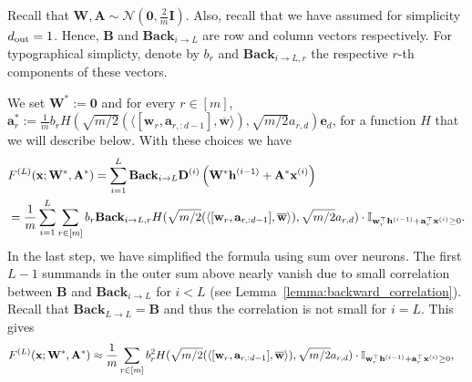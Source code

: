 Recall that $\mathbf{W}, \mathbf{A} \sim \mathcal{N}(\mathbf{0}, \frac{2}{m}\mathbf{I})$. Also, recall that we have assumed for simplicity $d_{\mathrm{out}}  = 1$. Hence, $\mathbf{B}$ and $\mathbf{Back}_{i \to L}$ are row and column vectors respectively. For typographical simplicty, denote by $b_r$ and $\mathbf{Back}_{i \to L, r}$ the respective $r$-th components of these vectors.



We set $\mathbf{W}^{\ast} := \mathbf{0}$ and for every $r \in [m]$, $\mathbf{a}_r^{\ast} :=\frac{1}{m} b_r H( \sqrt{m/2} (\langle [\mathbf{w}_{r}, \mathbf{a}_{r, :d-1}],  \overline{\mathbf{w}} \rangle), \sqrt{m/2} a_{r, d}) \mathbf{e}_d$, for a function $H$ that we will describe below. With these choices we have
    \begin{align*}
        &F^{(L)}(\bx; \mathbf{W}^{\ast}, \mathbf{A}^{\ast})  = \sum_{i=1}^{L}  \mathbf{Back}_{i \rightarrow L} \mathbf{D}^{(i)} \left(\mathbf{W}^{\ast} \mathbf{h}^{(i-1)} + \mathbf{A}^{\ast} \mathbf{x}^{(i)}\right) 
        \\&= \frac{1}{m} \sum_{i=1}^{L}   \sum_{r \in [m]}  b_{r}  \mathbf{Back}_{i \to L, r}  H( \sqrt{m/2} (\langle [\mathbf{w}_r, \mathbf{a}_{r, :d-1}],  \overline{\mathbf{w}} \rangle), \sqrt{m/2} a_{r, d})    \cdot \mathbb{I}_{\mathbf{w}_r^{\top} \mathbf{h}^{(i-1)} + \mathbf{a}_r^{\top} \mathbf{x}^{(i)} \ge 0}. %
	\end{align*}
	In the last step, we have simplified the formula using sum over neurons.  
	The first $L-1$ summands in the outer sum above nearly vanish due to small correlation between $\mathbf{B}$ and $\mathbf{Back}_{i \to L}$ for $i < L$ (see  Lemma~\ref{lemma:backward_correlation}). Recall that $\mathbf{Back}_{L \to L} = \mathbf{B}$ and thus the correlation is not small for $i=L$. This  gives
	\begin{align*}
		F^{(L)}(\bx; \mathbf{W}^{\ast}, \mathbf{A}^{\ast}) &\approx   \frac{1}{m} \sum_{r \in [m]}  b_{r}^2 H( \sqrt{m/2} (\langle [\mathbf{w}_r, \mathbf{a}_{r, :d-1}],  \overline{\mathbf{w}} \rangle), \sqrt{m/2} a_{r, d})  \cdot \mathbb{I}_{\mathbf{w}_r^{\top} \mathbf{h}^{(i-1)} + \mathbf{a}_r^{\top} \mathbf{x}^{(i)} \ge 0}, %
	\end{align*}
